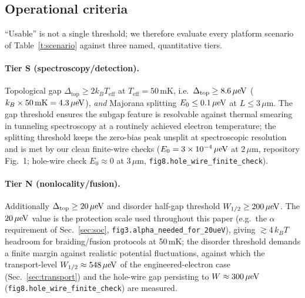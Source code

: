 \subsection{Operational criteria}\label{sec:usable}
``Usable'' is not a single threshold; we therefore evaluate every platform
scenario of Table~\ref{t:scenario} against three named, quantitative tiers.

\paragraph{Tier S (spectroscopy/detection).} Topological gap
$\Delta_{\mathrm{top}} \ge 2 k_B T_{\mathrm{eff}}$ at
$T_{\mathrm{eff}} = 50$\,mK, i.e.\ $\Delta_{\mathrm{top}} \ge 8.6\,\mu\mathrm{eV}$
($k_B \times 50\,\mathrm{mK} = 4.3\,\mu\mathrm{eV}$), \emph{and} Majorana splitting
$E_0 \le 0.1\,\mu\mathrm{eV}$ at $L \le 3\,\mu$m. The gap threshold ensures the
subgap feature is resolvable against thermal smearing in tunneling
spectroscopy at a routinely achieved electron temperature; the splitting
threshold keeps the zero-bias peak unsplit at spectroscopic resolution and
is met by our clean finite-wire checks ($E_0 = 3\times10^{-4}\,\mu\mathrm{eV}$ at
$2\,\mu$m, repository Fig.~1; hole-wire check $E_0 \approx 0$ at $3\,\mu$m,
\texttt{fig8.hole\_wire\_finite\_check}).

\paragraph{Tier N (nonlocality/fusion).} Additionally
$\Delta_{\mathrm{top}} \ge 20\,\mu\mathrm{eV}$ and disorder half-gap threshold
$W_{1/2} \ge 200\,\mu\mathrm{eV}$. The $20\,\mu\mathrm{eV}$ value is the protection scale used
throughout this paper (e.g.\ the $\alpha$ requirement of
Sec.~\ref{sec:soc}, \texttt{fig3.alpha\_needed\_for\_20ueV}), giving
$\gtrsim 4\,k_BT$ headroom for braiding/fusion protocols at 50\,mK; the
disorder threshold demands a finite margin against realistic potential
fluctuations, against which the transport-level
$W_{1/2} \approx 548\,\mu\mathrm{eV}$ of the engineered-electron case
(Sec.~\ref{sec:transport}) and the hole-wire gap persisting to
$W \approx 300\,\mu\mathrm{eV}$ (\texttt{fig8.hole\_wire\_finite\_check}) are measured.


